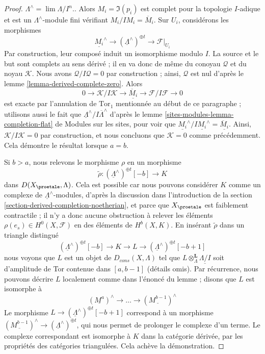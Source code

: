 \begin{proof}
{$\Lambda^\wedge = \lim \Lambda/I^n$.}.
Alors $M_i = \Im(p_i)$ est complet pour la topologie $I$-adique et
est un $\Lambda^\wedge$-module fini vérifiant $M_i/IM_i = \overline{M}_i$.
Sur $U_i$, considérons les morphismes
$$
\underline{M_i}^\wedge \to
(\underline{\Lambda}^\wedge)^{\oplus t} \to
\mathcal{F}|_{U_i}
$$
Par construction, leur composé induit un isomorphisme modulo $I$.
La source et le but sont complets au sens dérivé ; il en va donc de même du conoyau
$\mathcal{Q}$ et du noyau $\mathcal{K}$. Nous avons
$\mathcal{Q}/I\mathcal{Q} = 0$ par construction ; ainsi, $\mathcal{Q}$
est nul d'après le lemme \ref{lemma-derived-complete-zero}.
Alors
$$
0 \to \mathcal{K}/I\mathcal{K} \to
\underline{\overline{M}_i}
\to \mathcal{F}/I\mathcal{F} \to 0
$$
est exacte par l'annulation de $\text{Tor}_1$ mentionnée au début de ce
paragraphe ; utilisons aussi le fait que
$\underline{\Lambda}^\wedge/I\overline{\Lambda}^\wedge$ d'après le
lemme \ref{sites-modules-lemma-completion-flat} de Modules sur les sites,
pour voir que
$\underline{M_i}^\wedge/I\underline{M_i}^\wedge = \underline{\overline{M}_i}$.
Ainsi, $\mathcal{K}/I\mathcal{K} = 0$ par construction, et nous concluons
que $\mathcal{K} = 0$ comme précédemment. Cela démontre le résultat lorsque $a = b$.

\medskip\noindent
Si $b > a$, nous relevons le morphisme $\rho$ en un morphisme
$$
\tilde \rho : (\underline{\Lambda}^\wedge)^{\oplus t}[-b] \longrightarrow K
$$
dans $D(X_\proetale, \Lambda)$. Cela est possible car nous pouvons considérer
$K$ comme un complexe de $\underline{\Lambda}^\wedge$-modules, d'après la
discussion dans l'introduction de la
section \ref{section-derived-completion-noetherian},
et parce que $X_\proetale$ est faiblement contractile ;
il n'y a donc aucune obstruction à relever les éléments
$\rho(e_s) \in H^0(X, \mathcal{F})$ en des éléments de $H^b(X, K)$.
En insérant $\tilde \rho$ dans un triangle distingué
$$
(\underline{\Lambda}^\wedge)^{\oplus t}[-b] \to K \to L \to
(\underline{\Lambda}^\wedge)^{\oplus t}[-b + 1]
$$
nous voyons que $L$ est un objet de $D_{cons}(X, \Lambda)$ tel
que $L \otimes_\Lambda^\mathbf{L} \underline{\Lambda/I}$
soit d'amplitude de Tor contenue dans $[a, b - 1]$ (détails omis).
Par récurrence, nous pouvons décrire $L$ localement comme dans l'énoncé du lemme ; disons que
$L$ est isomorphe à
$$
(\underline{M^a})^\wedge \to \ldots \to (\underline{M^{b - 1}})^\wedge
$$
Le morphisme
$L \to (\underline{\Lambda}^\wedge)^{\oplus t}[-b + 1]$
correspond à un morphisme
$(\underline{M^{b - 1}})^\wedge \to (\underline{\Lambda}^\wedge)^{\oplus t}$,
qui nous permet de prolonger le complexe d'un terme. Le complexe correspondant
est isomorphe à $K$ dans la catégorie dérivée, par les propriétés
des catégories triangulées. Cela achève la démonstration.
\end{proof}

